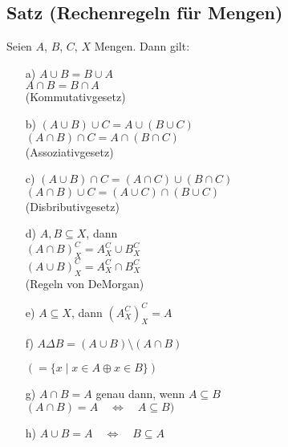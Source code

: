 \documentclass[a4paper, 12pt, twoside] {article}
\begin{document}

\subsection{Satz (Rechenregeln für Mengen)} %

Seien $A$, $B$, $C$, $X$ Mengen. Dann gilt:
\begin{itemize}
	\item[a)]
		$A \cup B = B \cup A$ \\
		$A \cap B = B \cap A$ \\
		(Kommutativgesetz)
		
	\item[b)]
		$(A \cup B) \cup C = A \cup (B \cup C)$ \\	
		$(A \cap B) \cap C = A \cap (B \cap C)$ \\
		(Assoziativgesetz)
		
	\item[c)]
		$(A \cup B) \cap C = (A \cap C) \cup (B \cap C)$ \\
		$(A \cap B) \cup C = (A \cup C) \cap (B \cup C)$ \\
		(Disbributivgesetz)
		
	\item[d)]
		$A,B \subseteq X$, dann \\
		$(A \cap B)^C_X = A^C_X \cup B^C_X$ \\
		$(A \cup B)^C_X = A^C_X \cap B^C_X$ \\
		(Regeln von DeMorgan)
		
	\item[e)]
		$A \subseteq X$, dann $(A^C_X)^C_X = A$
		
	\item[f)]
		$A \Delta B = (A \cup B) \setminus (A \cap B)$
		
		$(=\{x \mid x \in A \oplus x \in B\})$
			
		\begin{venndiagram2sets}
		\fillANotB \fillBNotA
		\end{venndiagram2sets}
		
	\item[g)]
		$A \cap B = A$ genau dann, wenn $A \subseteq B$ \\
		$(A \cap B) = A \quad \Leftrightarrow \quad A \subseteq B)$
		
	\item[h)]
		$A \cup B = A \quad \Leftrightarrow \quad B \subseteq A$
\end{itemize}
\end{document}
